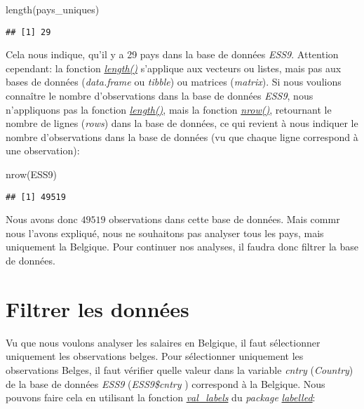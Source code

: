 \documentclass[
]{book}
\newenvironment{Shaded}{\begin{snugshade}}{\end{snugshade}}
\newcommand{\FunctionTok}[1]{\textcolor[rgb]{0.00,0.00,0.00}{#1}}
\newcommand{\NormalTok}[1]{#1}
\begin{document}
\begin{Shaded}
\begin{Highlighting}[]
\FunctionTok{length}\NormalTok{(pays\_uniques)}
\end{Highlighting}
\end{Shaded}

\begin{verbatim}
## [1] 29
\end{verbatim}

Cela nous indique, qu'il y a 29 pays dans la base de données \emph{ESS9}. Attention cependant: la fonction \emph{\href{https://www.rdocumentation.org/packages/base/versions/3.6.2/topics/length}{length()}} s'applique aux vecteurs ou listes, mais pas aux bases de données (\emph{data.frame} ou \emph{tibble}) ou matrices (\emph{matrix}). Si nous voulions connaître le nombre d'observations dans la base de données \emph{ESS9}, nous n'appliquons pas la fonction \emph{\href{https://www.rdocumentation.org/packages/base/versions/3.6.2/topics/length}{length()}}, mais la fonction \href{https://www.rdocumentation.org/packages/base/versions/3.6.2/topics/nrow}{\emph{nrow()}}, retournant le nombre de lignes (\emph{rows}) dans la base de données, ce qui revient à nous indiquer le nombre d'observations dans la base de données (vu que chaque ligne correspond à une observation):

\begin{Shaded}
\begin{Highlighting}[]
\FunctionTok{nrow}\NormalTok{(ESS9)}
\end{Highlighting}
\end{Shaded}

\begin{verbatim}
## [1] 49519
\end{verbatim}

Nous avons donc \(49519\) observations dans cette base de données. Mais commr nous l'avons expliqué, nous ne souhaitons pas analyser tous les pays, mais uniquement la Belgique. Pour continuer nos analyses, il faudra donc filtrer la base de données.

\hypertarget{filtrer-les-donnuxe9es}{%
\section{Filtrer les données}\label{filtrer-les-donnuxe9es}}

Vu que nous voulons analyser les salaires en Belgique, il faut sélectionner uniquement les observations belges. Pour sélectionner uniquement les observations Belges, il faut vérifier quelle valeur dans la variable \emph{cntry} (\emph{Country}) de la base de données \emph{ESS9} (\emph{ESS9\$cntry} ) correspond à la Belgique. Nous pouvons faire cela en utilisant la fonction \href{https://www.rdocumentation.org/packages/labelled/versions/2.10.0/topics/val_labels}{\emph{val\_labels}} du \emph{package} \href{https://cran.r-project.org/web/packages/labelled/vignettes/intro_labelled.html}{\emph{labelled}}:
\end{document}
